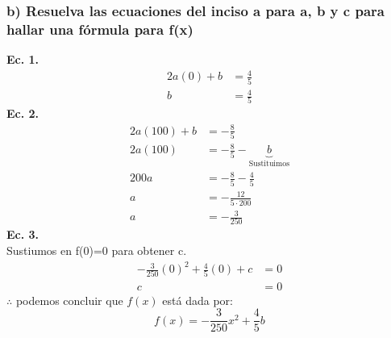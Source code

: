 \documentclass[11pt,letterpaper]{article}
\begin{document}
\subsubsection{b) Resuelva las ecuaciones del inciso a para a, b y c para hallar una fórmula para f(x)}
\textbf{Ec. 1.} \\
\begin{equation*}
  \begin{split}
    2a(0)+b &= \frac{4}{5} \\
    b &= \frac{4}{5}
  \end{split}
\end{equation*}
\textbf{Ec. 2.} \\
\begin{equation*}
  \begin{split}
    2a(100)+b &= -\frac{8}{5} \\
    2a(100) &= -\frac{8}{5}-\underbrace{b}_{\text{Sustituimos}} \\
    200a &= -\frac{8}{5}-\frac{4}{5} \\
    a &= -\frac{12}{5\cdot200} \\
    a &= -\frac{3}{250}
  \end{split}
\end{equation*}
\textbf{Ec. 3.} \\
Sustiumos en f(0)=0 para obtener c.
\begin{equation*}
  \begin{split}
    -\frac{3}{250}(0)^2+\frac{4}{5}(0)+c &= 0 \\
    c &= 0
  \end{split}
\end{equation*}
$\therefore$ podemos concluir que $f(x)$ está dada por:
\begin{equation*}
  f(x)=-\frac{3}{250}x^2+\frac{4}{5}b
\end{equation*}
\end{document}
